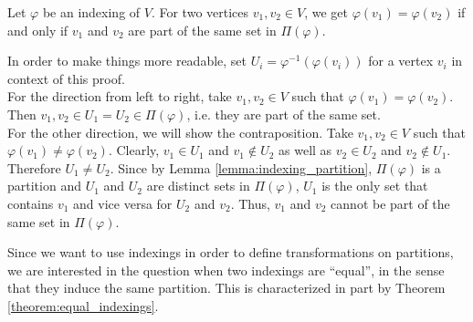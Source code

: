 \documentclass[11pt,a4paper]{article}
\numberwithin{equation}{section}
\newcommand{\idx}{\varphi}
\begin{document}
\begin{lemmarep}
    Let $\idx$ be an indexing of $V$. For two vertices $v_1,v_2 \in V$, we get $\idx(v_1) = \idx(v_2)$ if and only if $v_1$ and $v_2$ are part of the same set in $\Pi(\idx)$. \label{lemma:indexing_same_set}
\end{lemmarep}
\begin{appendixproof}
    In order to make things more readable, set $U_i = \idx^{-1}(\idx(v_i))$ for a vertex $v_i$ in context of this proof. \\ For the direction from left to right, take $v_1,v_2\in V$ such that $\idx(v_1)=\idx(v_2)$. Then $v_1,v_2 \in U_1 = U_2 \in \Pi(\idx)$, i.e. they are part of the same set. \\ For the other direction, we will show the contraposition. Take $v_1,v_2\in V$ such that $\idx(v_1)\neq \idx(v_2)$. Clearly, $v_1 \in U_1$ and $v_1 \not\in U_2$ as well as $v_2 \in U_2$ and $v_2 \not\in U_1$. Therefore $U_1 \neq U_2$. Since by Lemma \ref{lemma:indexing_partition}, $\Pi(\idx)$ is a partition and $U_1$ and $U_2$ are distinct sets in $\Pi(\idx)$, $U_1$ is the only set that contains $v_1$ and vice versa for $U_2$ and $v_2$. Thus, $v_1$ and $v_2$ cannot be part of the same set in $\Pi(\idx)$. 
\end{appendixproof}

Since we want to use indexings in order to define transformations on partitions, we are interested in the question when two indexings are ``equal'', in the sense that they induce the same partition. This is characterized in part by Theorem \ref{theorem:equal_indexings}.
\end{document}
